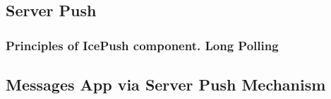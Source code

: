 \subsection{Server Push}
\subsubsection{Principles of IcePush component. Long Polling}
\subsection{Messages App via Server Push Mechanism}